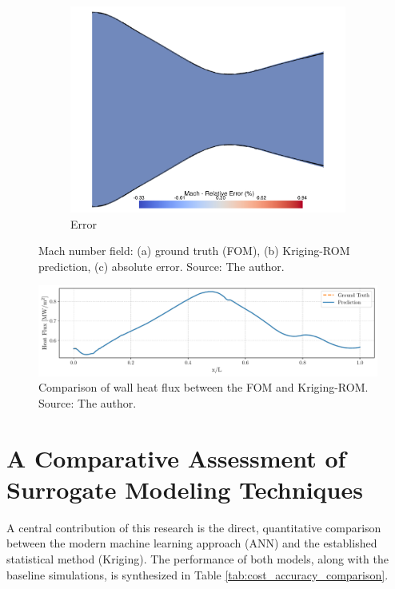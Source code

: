 \documentclass[tg, EN]{ufabcFHZh_tg}
\begin{document}
\begin{figure}[H]
\begin{subfigure}[b]{0.32\textwidth}
        \includegraphics[width=\textwidth]{Figuras/kriging_error_mach.pdf}
        \caption{Error}
    \end{subfigure}
    \caption{Mach number field: (a) ground truth (FOM), (b) Kriging-ROM prediction, (c) absolute error. Source: The author.}
    \label{fig:kriging_reconstruction_mach}
\end{figure}

\begin{figure}[H]
    \centering
    \includegraphics[width=\textwidth]{Figuras/kriging_heat_flux.pdf}
    \caption{Comparison of wall heat flux between the FOM and Kriging-ROM. Source: The author.}
    \label{fig:kriging_reconstruction_heat_flux}
\end{figure}

\section{A Comparative Assessment of Surrogate Modeling Techniques}

A central contribution of this research is the direct, quantitative comparison between the modern machine learning approach (ANN) and the established statistical method (Kriging). The performance of both models, along with the baseline simulations, is synthesized in Table \ref{tab:cost_accuracy_comparison}.
\end{document}
